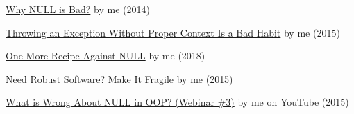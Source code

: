 \documentclass{article}
\begin{document}




\href{https://www.yegor256.com/2014/05/13/why-null-is-bad.html}{Why NULL is Bad?} by me (2014)

\href{https://www.yegor256.com/2015/12/01/rethrow-exceptions.html}{Throwing an Exception Without Proper Context Is a Bad Habit} by me (2015)

\href{https://www.yegor256.com/2018/05/22/default-arguments-against-null.html}{One More Recipe Against NULL} by me (2018)

\href{https://www.yegor256.com/2015/08/25/fail-fast.html}{Need Robust Software? Make It Fragile} by me (2015)

\href{https://www.youtube.com/watch?v=o3aNJX7AP3M}{What is Wrong About NULL in OOP? (Webinar \#3)} by me on YouTube (2015)
\end{document}
